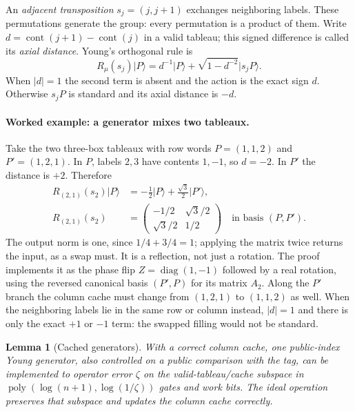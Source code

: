 \documentclass[11pt]{article}
\newtheorem{lemma}[theorem]{Lemma}
\theoremstyle{definition}
\newcommand{\ket}[1]{\lvert #1\rangle}
\newcommand{\poly}{\operatorname{poly}}
\newcommand{\cont}{\operatorname{cont}}
\begin{document}
An \emph{adjacent transposition} $s_j=(j,j+1)$ exchanges neighboring
labels. These permutations generate the group: every permutation is a
product of them. Write $d=\cont(j+1)-\cont(j)$ in a valid tableau;
this signed difference is called its \emph{axial distance}.
Young's orthogonal rule is
\[
 R_\mu(s_j)\ket P=d^{-1}\ket P+
 \sqrt{1-d^{-2}}\ket{s_jP}.
\]
When $|d|=1$ the second term is absent and the action is the exact sign $d$.
Otherwise $s_jP$ is standard and its axial distance is $-d$.

\paragraph{Worked example: a generator mixes two tableaux.}
Take the two three-box tableaux with row words $P=(1,1,2)$ and
$P'=(1,2,1)$. In $P$, labels $2,3$ have contents $1,-1$, so $d=-2$.
In $P'$ the distance is $+2$. Therefore
\[
 \begin{aligned}
 R_{(2,1)}(s_2)\ket P&=-\tfrac12\ket P+\tfrac{\sqrt3}{2}\ket{P'},\\
 R_{(2,1)}(s_2)&=
 \begin{pmatrix}-1/2&\sqrt3/2\\\sqrt3/2&1/2\end{pmatrix}
 \quad\text{in basis }(P,P').
 \end{aligned}
\]
The output norm is one, since $1/4+3/4=1$; applying the matrix twice
returns the input, as a swap must. It is a reflection, not just a
rotation. The proof implements it as the phase flip
$Z=\operatorname{diag}(1,-1)$ followed by a real rotation, using the
reversed canonical basis $(P',P)$ for its matrix $A_2$.
Along the $P'$ branch the column cache
must change from $(1,2,1)$ to $(1,1,2)$ as well. When the neighboring
labels lie in the same row or column instead, $|d|=1$ and there is only
the exact $+1$ or $-1$ term: the swapped filling would not be standard.

\begin{lemma}[Cached generators]\label{lem:generators}
With a correct column cache, one public-index Young generator, also
controlled on a public comparison with the tag, can be implemented to
operator error $\zeta$ on the valid-tableau/cache subspace in
$\poly(\log(n+1),\log(1/\zeta))$ gates and work bits. The ideal operation
preserves that subspace and updates the column cache correctly.
\end{lemma}
\end{document}

